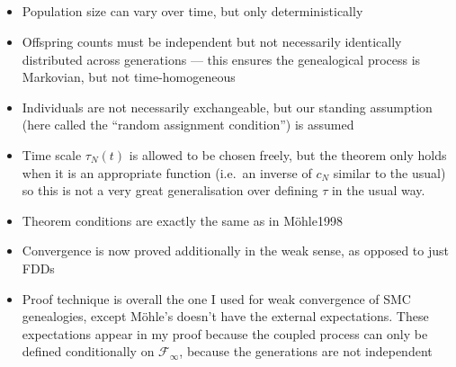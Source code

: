 \documentclass{article}
\begin{document}
\subsection*{\cite{mohle1999}}
\begin{itemize}
\item Population size can vary over time, but only deterministically
\item Offspring counts must be independent but not necessarily identically distributed across generations --- this ensures the genealogical process is Markovian, but not time-homogeneous
\item Individuals are not necessarily exchangeable, but our standing assumption (here called the ``random assignment condition'') is assumed
\item Time scale $\tau_N(t)$ is allowed to be chosen freely, but the theorem only holds when it is an appropriate function (i.e.\ an inverse of $c_N$ similar to the usual) so this is not a very great generalisation over defining $\tau$ in the usual way.
\item Theorem conditions are exactly the same as in M\"ohle1998
\item Convergence is now proved additionally in the weak sense, as opposed to just FDDs
\item Proof technique is overall the one I used for weak convergence of SMC genealogies, except M\"ohle's doesn't have the external expectations. These expectations appear in my proof because the coupled process can only be defined conditionally on $\mathcal{F}_\infty$, because the generations are not independent
\end{itemize}
\end{document}

